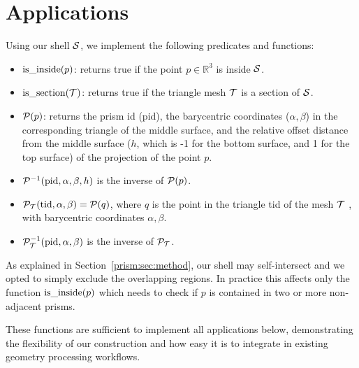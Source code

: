 \section{Applications}
\label{prism:sec:applications}
Using our shell $\S$, we implement the following predicates and functions:
\begin{itemize}
    \item $\isinside(p)$: returns true if the point $p \in \mathbb{R}^3$ is inside $\S$. %
    \item $\issection(\T)$: returns true if the triangle mesh $\T$ is a section of $\S$.
    \item $\P(p)$: returns the prism id (pid), the barycentric coordinates ($\alpha,\beta$) {in the corresponding triangle of the middle surface}, {and the relative offset distance from the middle surface 
    ($h$, which is -1 for the bottom surface, and 1 for the top surface) of the projection of the point $p$.}
    \item $\P^{-1}(\text{pid},\alpha,\beta,h)$ is the inverse of $\P(p)$.
    \item {$\P_\T(\text{tid}, \alpha,\beta) = \P(q)$, where $q$ is the point in the triangle tid of the mesh $\T$ , with barycentric coordinates $\alpha,\beta$.}
    \item {$\P_\T^{-1}(\text{pid},\alpha,\beta)$ is the inverse of $\P_\T$.}
\end{itemize}

As explained in Section~\ref{prism:sec:method}, our shell may self-intersect and 
we opted to simply exclude the overlapping regions. In practice this affects only the function $\isinside(p)$ which needs to check if $p$ is contained in two or more non-adjacent prisms. 

These functions are sufficient to implement all applications below, demonstrating the flexibility of our construction and how easy it is to integrate in existing geometry processing workflows. %



